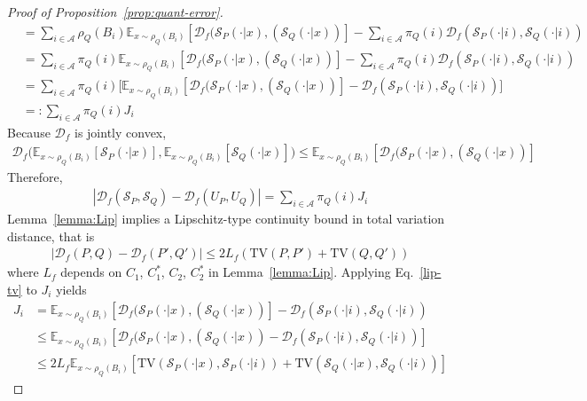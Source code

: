 \documentclass{article}
\theoremstyle{plain}
\theoremstyle{definition}
\theoremstyle{remark}
\begin{document}
\begin{proof}[Proof of Proposition~\ref{prop:quant-error}]
\begin{align}
     &=\sum_{i\in \mathcal{A}}  \rho_Q(B_i) \mathbb{E}_{x\sim \rho_Q(B_i)}[\mathcal{D}_f (\mathcal{S}_P(\cdot|x),(\mathcal{S}_Q(\cdot|x))]- \sum_{i \in \mathcal{A}} \pi_Q(i) \mathcal{D}_f(\mathcal{S}_P(\cdot|i),\mathcal{S}_Q(\cdot|i)) \\
     & =\sum_{i\in \mathcal{A}}  \pi_Q(i) \mathbb{E}_{x\sim \rho_Q(B_i)}[ \mathcal{D}_f (\mathcal{S}_P(\cdot|x),(\mathcal{S}_Q(\cdot|x))]- \sum_{i \in \mathcal{A}} \pi_Q(i) \mathcal{D}_f(\mathcal{S}_P(\cdot|i),\mathcal{S}_Q(\cdot|i))\\
     & = \sum_{i\in \mathcal{A}}  \pi_Q(i)\big[\mathbb{E}_{x\sim \rho_Q(B_i)}[ \mathcal{D}_f (\mathcal{S}_P(\cdot|x),(\mathcal{S}_Q(\cdot|x))] - \mathcal{D}_f(\mathcal{S}_P(\cdot|i),\mathcal{S}_Q(\cdot|i))\big] \\
     & =: \sum_{i\in \mathcal{A}}  \pi_Q(i) J_i
    \end{align}
    Because $\mathcal{D}_f$ is jointly convex,
    \begin{align}
\mathcal{D}_f(\mathbb{E}_{x\sim \rho_Q(B_i)}[\mathcal{S}_P(\cdot|x)],\mathbb{E}_{x\sim \rho_Q(B_i)}[\mathcal{S}_Q(\cdot|x)]\big) \le \mathbb{E}_{x\sim \rho_Q(B_i)}[ \mathcal{D}_f (\mathcal{S}_P(\cdot|x),(\mathcal{S}_Q(\cdot|x))]
    \end{align}
    Therefore,
    \begin{align}
    |\mathcal{D}_f(\mathcal{S}_P,\mathcal{S}_Q)-\mathcal{D}_f(U_P,U_Q)| = \sum_{i\in \mathcal{A}}  \pi_Q(i) J_i
    \end{align}
Lemma~\ref{lemma:Lip} implies a Lipschitz-type continuity bound in total variation distance, that is
\begin{align}
    |\mathcal{D}_f(P,Q)-\mathcal{D}_f(P',Q') | \le 2L_f (\text{TV}(P,P')+\text{TV}(Q,Q')) \label{lip-tv}
\end{align}
where $L_f$ depends on $C_1$, $C_1^*$, $C_2$, $C_2^*$ in Lemma~\ref{lemma:Lip}. Applying Eq.~\ref{lip-tv} to $J_i$ yields
\begin{align}
    J_i &= \mathbb{E}_{x\sim \rho_Q(B_i)}[ \mathcal{D}_f (\mathcal{S}_P(\cdot|x),(\mathcal{S}_Q(\cdot|x))] - \mathcal{D}_f(\mathcal{S}_P(\cdot|i),\mathcal{S}_Q(\cdot|i)) \\
    &\le \mathbb{E}_{x\sim \rho_Q(B_i)}[\mathcal{D}_f (\mathcal{S}_P(\cdot|x),(\mathcal{S}_Q(\cdot|x)) - \mathcal{D}_f(\mathcal{S}_P(\cdot|i),\mathcal{S}_Q(\cdot|i))] \\
    & \le 2L_f \mathbb{E}_{x\sim \rho_Q(B_i)} [\text{TV}(\mathcal{S}_P(\cdot|x),\mathcal{S}_P(\cdot|i)) + \text{TV}(\mathcal{S}_Q(\cdot|x),\mathcal{S}_Q(\cdot|i))]

\end{align}
\end{proof}
\end{document}
